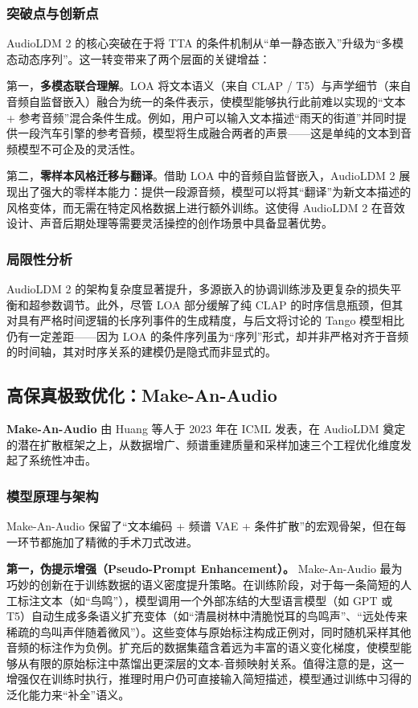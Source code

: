 \documentclass[12pt,a4paper]{article}
\begin{document}
\subsubsection{突破点与创新点}
AudioLDM 2 的核心突破在于将 TTA 的条件机制从“单一静态嵌入”升级为“多模态动态序列”。这一转变带来了两个层面的关键增益：

第一，\textbf{多模态联合理解}。LOA 将文本语义（来自 CLAP / T5）与声学细节（来自音频自监督嵌入）融合为统一的条件表示，使模型能够执行此前难以实现的“文本 + 参考音频”混合条件生成。例如，用户可以输入文本描述“雨天的街道”并同时提供一段汽车引擎的参考音频，模型将生成融合两者的声景——这是单纯的文本到音频模型不可企及的灵活性。

第二，\textbf{零样本风格迁移与翻译}。借助 LOA 中的音频自监督嵌入，AudioLDM 2 展现出了强大的零样本能力：提供一段源音频，模型可以将其“翻译”为新文本描述的风格变体，而无需在特定风格数据上进行额外训练。这使得 AudioLDM 2 在音效设计、声音后期处理等需要灵活操控的创作场景中具备显著优势。

\subsubsection{局限性分析}
AudioLDM 2 的架构复杂度显著提升，多源嵌入的协调训练涉及更复杂的损失平衡和超参数调节。此外，尽管 LOA 部分缓解了纯 CLAP 的时序信息瓶颈，但其对具有严格时间逻辑的长序列事件的生成精度，与后文将讨论的 Tango 模型相比仍有一定差距——因为 LOA 的条件序列虽为“序列”形式，却并非严格对齐于音频的时间轴，其对时序关系的建模仍是隐式而非显式的。

\subsection{高保真极致优化：Make-An-Audio}

\textbf{Make-An-Audio} 由 Huang 等人于 2023 年在 ICML 发表，在 AudioLDM 奠定的潜在扩散框架之上，从数据增广、频谱重建质量和采样加速三个工程优化维度发起了系统性冲击。

\subsubsection{模型原理与架构}
Make-An-Audio 保留了“文本编码 + 频谱 VAE + 条件扩散”的宏观骨架，但在每一环节都施加了精微的手术刀式改进。

\textbf{第一，伪提示增强（Pseudo-Prompt Enhancement）。} Make-An-Audio 最为巧妙的创新在于训练数据的语义密度提升策略。在训练阶段，对于每一条简短的人工标注文本（如“鸟鸣”），模型调用一个外部冻结的大型语言模型（如 GPT 或 T5）自动生成多条语义扩充变体（如“清晨树林中清脆悦耳的鸟鸣声”、“远处传来稀疏的鸟叫声伴随着微风”）。这些变体与原始标注构成正例对，同时随机采样其他音频的标注作为负例。扩充后的数据集蕴含着远为丰富的语义变化梯度，使模型能够从有限的原始标注中蒸馏出更深层的文本-音频映射关系。值得注意的是，这一增强仅在训练时执行，推理时用户仍可直接输入简短描述，模型通过训练中习得的泛化能力来“补全”语义。
\end{document}
